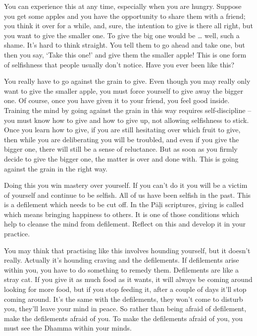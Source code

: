 You can experience this at any time, especially when you are hungry. Suppose you get some apples and you have the opportunity to share them with a friend; you think it over for a while, and, sure, the intention to give is there all right, but you want to give the smaller one. To give the big one would be \ldots{} well, such a shame. It's hard to think straight. You tell them to go ahead and take one, but then you say, `Take this one!' and give them the smaller apple! This is one form of selfishness that people usually don't notice. Have you ever been like this?

You really have to go against the grain to give. Even though you may really only want to give the smaller apple, you must force yourself to give away the bigger one. Of course, once you have given it to your friend, you feel good inside. Training the mind by going against the grain in this way requires self-discipline -- you must know how to give and how to give up, not allowing selfishness to stick. Once you learn how to give, if you are still hesitating over which fruit to give, then while you are deliberating you will be troubled, and even if you give the bigger one, there will still be a sense of reluctance. But as soon as you firmly decide to give the bigger one, the matter is over and done with. This is going against the grain in the right way.

Doing this you win mastery over yourself. If you can't do it you will be a victim of yourself and continue to be selfish. All of us have been selfish in the past. This is a defilement which needs to be cut off. In the P\=a\d{l}i scriptures, giving is called  which means bringing happiness to others. It is one of those conditions which help to cleanse the mind from defilement. Reflect on this and develop it in your practice.

You may think that practising like this involves hounding yourself, but it doesn't really. Actually it's hounding craving and the defilements. If defilements arise within you, you have to do something to remedy them. Defilements are like a stray cat. If you give it as much food as it wants, it will always be coming around looking for more food, but if you stop feeding it, after a couple of days it'll stop coming around. It's the same with the defilements, they won't come to disturb you, they'll leave your mind in peace. So rather than being afraid of defilement, make the defilements afraid of you. To make the defilements afraid of you, you must see the Dhamma within your minds.

